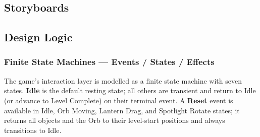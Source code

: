 \documentclass[11pt, letterpaper]{article}
\begin{document}
    \subsection{Storyboards}

    \subsection{Design Logic}

        \subsubsection{Finite State Machines --- Events / States / Effects}

        The game's interaction layer is modelled as a finite state machine with
        seven states. \textbf{Idle} is the default resting state; all others are
        transient and return to Idle (or advance to Level Complete) on their
        terminal event. A \textbf{Reset} event is available in Idle, Orb Moving,
        Lantern Drag, and Spotlight Rotate states; it returns all objects and the
        Orb to their level-start positions and always transitions to Idle.
\end{document}
